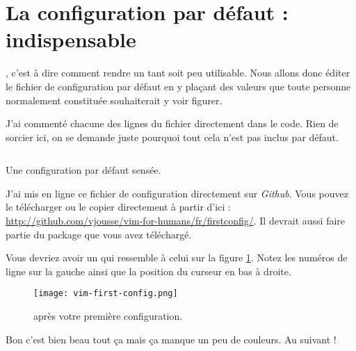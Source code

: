 \newpage
\section{La configuration par défaut : indispensable}

, c'est à dire comment rendre \vim un tant soit peu utilisable. Nous allons donc éditer le fichier de configuration par défaut \vimrc{} en y plaçant des valeurs que toute personne normalement constituée souhaiterait y voir figurer.

J'ai commenté chacune des lignes du fichier directement dans le code. Rien de sorcier ici, on se demande juste pourquoi tout cela n'est pas inclus par défaut.

\begin{listing}[H]
    \inputminted[bgcolor=bg, fontsize=\footnotesize]{vim}{../vimconfig/firstconfig/vimrc}
    \caption{Une configuration par défaut sensée.}
    \label{code:first-config}
\end{listing}

J'ai mis en ligne ce fichier de configuration directement sur \emph{Github}. Vous pouvez le télécharger ou le copier directement à partir d'ici : \url{http://github.com/vjousse/vim-for-humans/fr/firstconfig/}. Il devrait aussi faire partie du package que vous avez téléchargé.

Vous devriez avoir un \vim qui ressemble à celui sur la figure \ref{fig:first-config}. Notez les numéros de ligne sur la gauche ainsi que la position du curseur en bas à droite.

\begin{figure}%
  \texttt{[image: vim-first-config.png]}
  \caption{\vim après votre première configuration.}
  \label{fig:first-config}
\end{figure}

Bon c'est bien beau tout ça mais ça manque un peu de couleurs. Au suivant !

